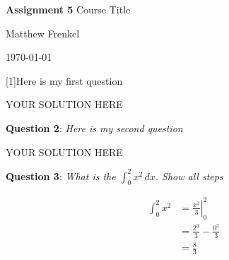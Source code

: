 \documentclass{article}
\newcommand{\question}[2][]{\begin{flushleft}\textbf{Question #1}: \textit{#2}\end{flushleft}}
\newcommand{\maketitletwo}[2][]{\begin{center}
        \Large{\textbf{Assignment #1} %
            Course Title} %
        \vspace{5pt}
        
        \normalsize{Matthew Frenkel  %
        
        \today}        %
        \vspace{15pt}
\end{center}}
\begin{document}
    \maketitletwo[5]  %
    
    \question[1]{Here is my first question} 
    
    YOUR SOLUTION HERE
    
    \question[2]{Here is my second question}
    
    YOUR SOLUTION HERE
    
    \question[3]{What is the \Large{$\int_0^2 x^2 \, dx $}\normalsize{. Show all steps}}
    
    \begin{align*}
    \int_0^2 x^2 &= \left. \frac{x^3}{3} \right|_0^2 \\
                 &= \frac{2^3}{3}-\frac{0^3}{3}\\
                 &= \frac{8}{3}
    \end{align*}
\end{document}
